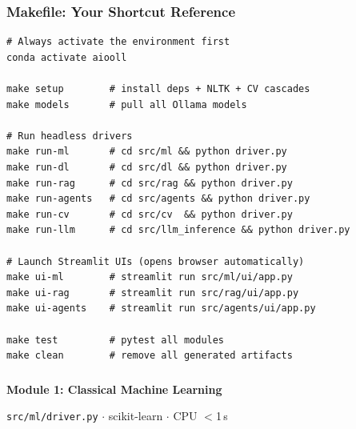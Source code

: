 \begin{frame}[fragile]\frametitle{Makefile: Your Shortcut Reference}
\begin{lstlisting}
# Always activate the environment first
conda activate aiooll

make setup        # install deps + NLTK + CV cascades
make models       # pull all Ollama models

# Run headless drivers
make run-ml       # cd src/ml && python driver.py
make run-dl       # cd src/dl && python driver.py
make run-rag      # cd src/rag && python driver.py
make run-agents   # cd src/agents && python driver.py
make run-cv       # cd src/cv  && python driver.py
make run-llm      # cd src/llm_inference && python driver.py

# Launch Streamlit UIs (opens browser automatically)
make ui-ml        # streamlit run src/ml/ui/app.py
make ui-rag       # streamlit run src/rag/ui/app.py
make ui-agents    # streamlit run src/agents/ui/app.py

make test         # pytest all modules
make clean        # remove all generated artifacts
\end{lstlisting}
\end{frame}

\begin{frame}[fragile]\frametitle{}
\begin{center}
{\Large \textbf{Module 1: Classical Machine Learning}}\

\texttt{src/ml/driver.py} $\cdot$ scikit-learn $\cdot$ CPU $<$1\,s
\end{center}
\end{frame}

